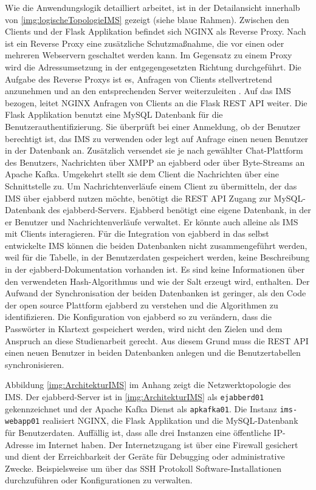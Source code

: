 \documentclass[a4paper,titlepage,halfparskip,12pt]{scrreprt}
\begin{document}
\begin{onehalfspacing}
Wie die Anwendungslogik detailliert arbeitet, ist in der Detailansicht innerhalb von \autoref{img:logischeTopologieIMS} gezeigt (siehe blaue Rahmen). Zwischen den Clients und der Flask Applikation befindet sich NGINX als Reverse Proxy. Nach \cite{reverseProxyDesc} ist ein Reverse Proxy eine zusätzliche Schutzmaßnahme, die vor einen oder mehreren Webservern geschaltet werden kann. Im Gegensatz zu einem Proxy wird die Adressumsetzung in der entgegengesetzten Richtung durchgeführt.
Die Aufgabe des Reverse Proxys ist es, Anfragen von Clients stellvertretend anzunehmen und an den entsprechenden Server weiterzuleiten \cite{reverseProxyDesc}. Auf das \ac{IMS} bezogen, leitet NGINX Anfragen von Clients an die Flask \acs{REST} \acs{API} weiter. Die Flask Applikation benutzt eine MySQL Datenbank für die Benutzerauthentifizierung. Sie überprüft bei einer Anmeldung, ob der Benutzer berechtigt ist, das \ac{IMS} zu verwenden oder legt auf Anfrage einen neuen Benutzer in der Datenbank an. Zusätzlich versendet sie je nach gewählter Chat-Plattform des Benutzers, Nachrichten über \ac{XMPP} an ejabberd oder über Byte-Streams an Apache Kafka. Umgekehrt stellt sie dem Client die Nachrichten über eine Schnittstelle zu. Um Nachrichtenverläufe einem Client zu übermitteln, der das \ac{IMS} über ejabberd nutzen möchte, benötigt die \acs{REST} \acs{API} Zugang zur MySQL-Datenbank des ejabberd-Servers. Ejabberd benötigt eine eigene Datenbank, in der er Benutzer und Nachrichtenverläufe verwaltet. Er könnte auch alleine als \ac{IMS} mit Clients interagieren. Für die Integration von ejabberd in das selbst entwickelte \ac{IMS} können die beiden Datenbanken nicht zusammengeführt werden, weil für die Tabelle, in der Benutzerdaten gespeichert werden, keine Beschreibung in der ejabberd-Dokumentation vorhanden ist. Es sind keine Informationen über den verwendeten Hash-Algorithmus und wie der Salt erzeugt wird, enthalten. Der Aufwand der Synchronisation der beiden Datenbanken ist geringer, als den Code der open source Plattform ejabberd zu verstehen und die Algorithmen zu identifizieren. Die Konfiguration von ejabberd so zu verändern, dass die Passwörter in Klartext gespeichert werden, wird nicht den Zielen und dem Anspruch an diese Studienarbeit gerecht. Aus diesem Grund muss die \acs{REST} \acs{API} einen neuen Benutzer in beiden Datenbanken anlegen und die Benutzertabellen synchronisieren.

Abbildung \autoref{img:ArchitekturIMS} im Anhang zeigt die Netzwerktopologie des \ac{IMS}. Der ejabberd-Server ist in \autoref{img:ArchitekturIMS} als \texttt{ejabberd01} gekennzeichnet und der Apache Kafka Dienst als \texttt{apkafka01}. Die Instanz \texttt{ims-webapp01} realisiert NGINX, die Flask Applikation und die MySQL-Datenbank für Benutzerdaten. Auffällig ist, dass alle drei Instanzen eine öffentliche IP-Adresse im Internet haben. Der Internetzugang ist über eine Firewall gesichert und dient der Erreichbarkeit der Geräte für Debugging oder administrative Zwecke. Beispielsweise um über das \ac{SSH} Protokoll Software-Installationen durchzuführen oder Konfigurationen zu verwalten.


\end{onehalfspacing}
\end{document}
